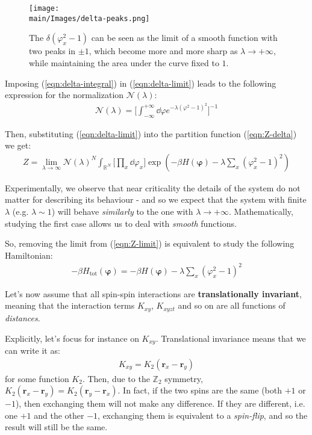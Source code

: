 \documentclass[../../main.tex]{subfiles}
\begin{document}
\begin{figure}[H]
    \centering
    \texttt{[image: \\main/Images/delta-peaks.png]}
    \caption{The $\delta(\varphi_x^2-1)$ can be seen as the limit of a smooth function with two peaks in $\pm 1$, which become more and more sharp as $\lambda \to +\infty$, while maintaining the area under the curve fixed to $1$.}
    \label{fig:delta-peaks}
\end{figure}

Imposing (\ref{eqn:delta-integral}) in (\ref{eqn:delta-limit}) leads to the following expression for the normalization $\mathcal{N}(\lambda)$:
\begin{align*}
    \mathcal{N}(\lambda) = \Big[\int_{-\infty}^{+\infty} \dd{\varphi} e^{-\lambda (\varphi^2-1)^2}\Big]^{-1}
\end{align*}

Then, substituting (\ref{eqn:delta-limit}) into the partition function (\ref{eqn:Z-delta}) we get:
\begin{align} \label{eqn:Z-limit}
    Z = \lim_{\lambda \to \infty} \mathcal{N}(\lambda)^N \int_{\mathbb{R}^N} \Big[\prod_x \dd{\varphi_x} \Big] \exp\left(-\beta H (\bm{\varphi}) - \lambda\sum_x (\varphi_x^2-1)^2 \right)
\end{align}

Experimentally, we observe that near criticality the details of the system do not matter for describing its behaviour - and so we expect that the system with finite $\lambda$ (e.g. $\lambda \sim 1$) will behave \textit{similarly} to the one with $\lambda \to +\infty$. Mathematically, studying the first case allows us to deal with \textit{smooth} functions.

\medskip

So, removing the limit from (\ref{eqn:Z-limit}) is equivalent to study the following Hamiltonian:
\begin{align*}
    -\beta H_{\mathrm{tot}}(\bm{\varphi}) = -\beta H(\bm{\varphi}) - \lambda\sum_x (\varphi_x^2 -1)^2 
\end{align*}

Let's now assume that all spin-spin interactions are \textbf{translationally invariant}, meaning that the interaction terms $K_{xy}$, $K_{xyzt}$ and so on are all functions of \textit{distances}.

\medskip

Explicitly, let's focus for instance on $K_{xy}$. Translational invariance means that we can write it as:
\begin{align*}
    K_{xy} = K_2(\bm{r}_x - \bm{r}_y)
\end{align*}
for some function $K_2$. Then, due to the $\mathbb{Z}_2$ symmetry, $K_2(\bm{r}_x - \bm{r}_y) = K_2(\bm{r}_y - \bm{r}_x)$. In fact, if the two spins are the same (both $+1$ or $-1$), then exchanging them will not make any difference. If they are different, i.e. one $+1$ and the other $-1$, exchanging them is equivalent to a \textit{spin-flip}, and so the result will still be the same. 
\end{document}
